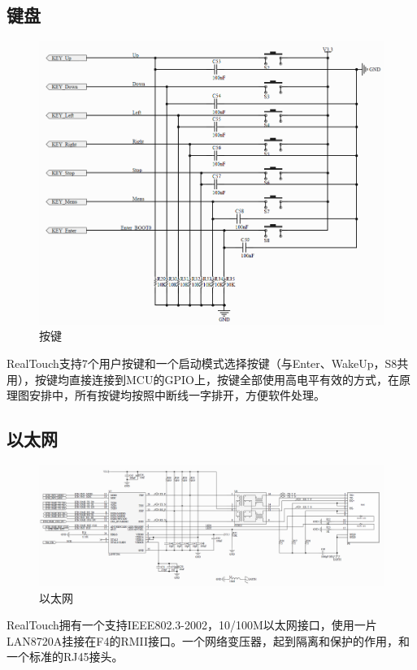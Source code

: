 \documentclass[titlepage]{article}
\begin{document}
  \subsection{键盘}
  \begin{figure}[h]
  \centering
  \includegraphics[width=15cm]{key.png}
  \caption{按键}
 \end{figure}
 RealTouch支持7个用户按键和一个启动模式选择按键（与Enter、WakeUp，S8共用），按键均直接连接到MCU的GPIO上，按键全部使用高电平有效的方式，在原理图安排中，所有按键均按照中断线一字排开，方便软件处理。
 \newpage
  \subsection{以太网}
  \begin{figure}[h]
  \centering
  \includegraphics[width=15cm]{eth.png}
  \caption{以太网}
 \end{figure}
 RealTouch拥有一个支持IEEE802.3-2002，10/100M以太网接口，使用一片LAN8720A挂接在F4的RMII接口。一个网络变压器，起到隔离和保护的作用，和一个标准的RJ45接头。
\end{document}
